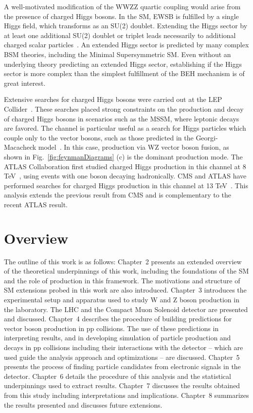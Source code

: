 A well-motivated modification of the WWZZ quartic coupling would arise from
the presence of charged Higgs bosons.
In the SM, EWSB is fulfilled by a single Higgs field, which transforms as an SU(2) doublet.
Extending the Higgs sector by at least one additional SU(2) doublet or triplet leads necessarily
to additional charged scalar particles~\cite{Arbey:2017gmh}. An extended Higgs sector is predicted by many
complex BSM theories, including the Minimal Supersymmetric SM. 
Even without an 
underlying theory predicting an extended Higgs sector, establishing if the Higgs 
sector is more complex than the simplest fulfillment of the BEH mechanism is of 
great interest.

Extensive searches for charged Higgs bosons were carried out at the 
LEP Collider~\cite{ALEPHCollaboration2013}. 
These searches placed strong constraints on the production
and decay of charged Higgs bosons in scenarios such as the MSSM, where leptonic
decays are favored. 
The \WZjj channel is particular useful as a search for Higgs particles 
which couple only to the vector bosons, such as those predicted in the 
Georgi-Macacheck model~\cite{Georgi:1985nv}. In this case, production via WZ vector
boson fusion, as shown in Fig.~\ref{fig:feynmanDiagrams} (c) is the dominant 
production mode.
The ATLAS Collaboration first studied charged Higgs production in this channel
at 8 TeV~\cite{Aad:2015nfa}, using events with one boson decaying hadronically.
CMS and ATLAS have performed searches for charged Higgs production in this channel 
at 13 TeV~\cite{Sirunyan:2017sbn,Aaboud:2018ohp}. This analysis extends the previous result from CMS and is complementary
to the recent ATLAS result.

\section{Overview}

The outline of this work is as follows: Chapter~2 presents an extended 
overview of the theoretical underpinnings of this work, including the foundations
of the SM and the role of \EWWZ production in this framework. The motivations 
and structure of SM extensions probed in this work are also introduced.
Chapter~3 introduces the experimental setup and apparatus used to study W and 
Z boson production in the laboratory. The LHC and the Compact Muon Solenoid 
detector are presented and discussed. Chapter~4 describes the procedure of 
building predictions for vector boson production in pp collisions.
The use of these predictions in interpreting results, and in developing simulation
of particle production and decays in pp collisions including their interactions
with the detector -- which are used 
guide the analysis approach and optimizations -- are discussed. Chapter~5 presents
the process of finding particle candidates from electronic signals in the detector.
Chapter~6 details the procedure of this analysis and the statistical underpinnings
used to extract results. Chapter~7 discusses the results obtained from this study
including interpretations and implications. Chapter~8 summarizes the
results presented and discusses future extensions.
